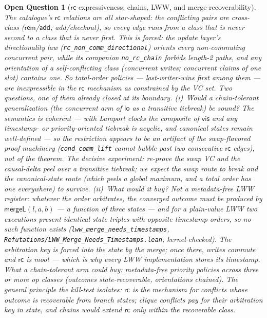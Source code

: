 \documentclass[11pt]{article}
\newtheorem{openq}[theorem]{Open Question}
\newcommand{\rcrel}{\mathsf{rc}}                 %
\newcommand{\add}{\mathsf{add}}
\newcommand{\rem}{\mathsf{rem}}
\newcommand{\mergeL}{\mathsf{mergeL}}
\newcommand{\lean}[1]{\texttt{#1}}
\begin{document}
\begin{openq}[$\rcrel$-expressiveness: chains, LWW, and
merge-recoverability]
\label{oq:rcchain}
The catalogue's $\rcrel$ relations are all \emph{star-shaped}: the
conflicting pairs are cross-class ($\rem$/$\add$; add/checkout), so every
edge runs from a class that is never second to a class that is never
first. This is forced: the update layer's directionality law
(\lean{rc\_non\_comm\_directional}) orients every non-commuting concurrent
pair, while its companion \lean{no\_rc\_chain} forbids length-2 paths, and any orientation of a \emph{self}-conflicting
class (concurrent writes; concurrent claims of one slot) contains one. So
total-order policies --- last-writer-wins first among them --- are
inexpressible in the $\rcrel$ mechanism as constrained by the VC set.
Two questions, one of them already closed at its boundary. (i)~Would a
\emph{chain-tolerant} generalization (the concurrent arm of $\mathsf{lo}$ as a
transitive tiebreak) be sound? The semantics is coherent --- with Lamport
clocks the composite of $\mathsf{vis}$ and any timestamp- or priority-oriented
tiebreak is acyclic, and canonical states remain well-defined --- so the
restriction appears to be an artifact of the swap-flavored proof
machinery (\lean{cond\_comm\_lift} cannot bubble past two consecutive
$\rcrel$ edges), not of the theorem. The decisive experiment:
re-prove the swap VC and the causal-delta peel over a transitive
tiebreak; we expect the swap route to break and the canonical-state route
(which peels a global maximum, and a total order has one everywhere) to
survive. (ii)~What would it buy? \emph{Not} a metadata-free LWW register:
whatever the order arbitrates, the converged outcome must be produced by
$\mergeL(l,a,b)$ --- a function of three \emph{states} --- and for a
plain-value LWW two executions present identical state triples with
opposite timestamp orders, so no such function exists
(\lean{lww\_merge\_needs\_timestamps},
\lean{Refutations/LWW\_Merge\_Needs\_Timestamps.lean}, kernel-checked).
The arbitration key is forced into the state by the \emph{merge}; once
there, writes commute and $\rcrel$ is moot --- which is why every
LWW implementation stores its timestamp. What a chain-tolerant arm
\emph{could} buy: metadata-free \emph{priority} policies across three or
more op classes (outcomes state-recoverable, orientations chained). The
general principle the kill-test
isolates: $\rcrel$ is the mechanism for conflicts whose outcome is
recoverable from branch states; clique conflicts pay for their arbitration
key in state, and chains would extend $\rcrel$ only within the
recoverable class.


\end{openq}
\end{document}
